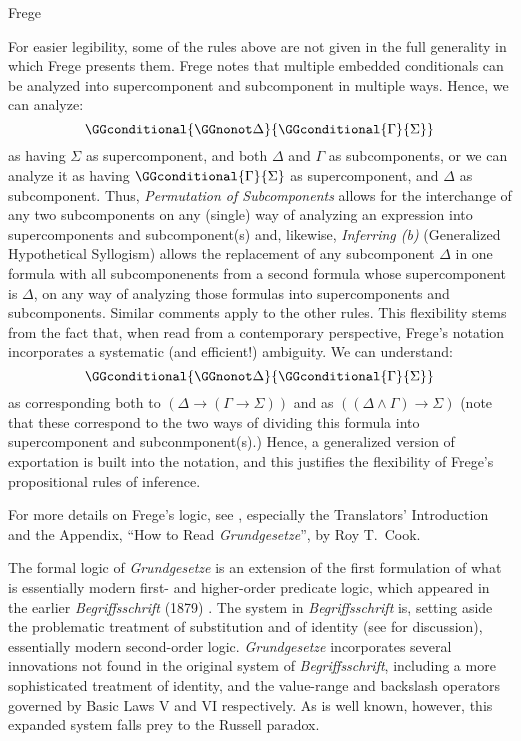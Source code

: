 \begin{entry}{Frege}
\begin{clarifications}
For easier legibility, some of the rules above are not given in the full generality in which Frege presents them. Frege notes that multiple embedded conditionals can be analyzed into supercomponent and subcomponent in multiple ways. Hence, we can analyze:
$$
\GGconditional{\GGnonot\Delta}{\GGconditional{\Gamma}{\Sigma}}
$$
as having $\Sigma$ as supercomponent, and both $\Delta$ and $\Gamma$ as subcomponents, or we can analyze it as having $\GGconditional{\Gamma}{\Sigma}$ as supercomponent, and $\Delta$ as subcomponent. Thus, \emph{Permutation of Subcomponents} allows for the interchange of any two subcomponents on any (single) way of analyzing an expression into supercomponents and subcomponent(s) and, likewise, \emph{Inferring (b)} (Generalized Hypothetical Syllogism) allows the replacement of any subcomponent $\Delta$ in one formula with all subcomponenents from a second formula whose supercomponent is $\Delta$, on any way of analyzing those formulas into supercomponents and subcomponents. Similar comments apply to the other rules.
This flexibility stems from the fact that, when read from a contemporary perspective, Frege's notation incorporates a systematic (and efficient!) ambiguity. We can understand:
$$
\GGconditional{\GGnonot\Delta}{\GGconditional{\Gamma}{\Sigma}}
$$
as corresponding both to $(\Delta \rightarrow (\Gamma \rightarrow \Sigma))$ and as $((\Delta \wedge \Gamma) \rightarrow \Sigma)$ (note that these correspond to the two ways of dividing this formula into supercomponent and subconmponent(s).) Hence, a generalized version of exportation is built into the notation, and this justifies the flexibility of Frege's propositional rules of inference.

For more details on Frege's logic, see  \cite{Frege2013}, especially the Translators' Introduction and the Appendix, ``How to Read \emph{Grundgesetze}'', by Roy T.\ Cook.

\end{clarifications}

\begin{history}
The formal logic of \emph{Grundgesetze} is an extension of the first formulation of what is essentially modern first- and higher-order predicate logic, which appeared in the earlier \emph{Begriffsschrift} (1879) \cite{Frege1879}. The system in \emph{Begriffsschrift} is, setting aside the problematic treatment of substitution and of identity (see \cite{Boolos1985} for discussion), essentially modern second-order logic. \emph{Grundgesetze} incorporates several innovations not found in the original system of \emph{Begriffsschrift}, including a more sophisticated treatment of identity, and the value-range and backslash operators governed by Basic Laws V and VI respectively. As is well known, however, this expanded system falls prey to the Russell paradox.


\end{history}
\end{entry}
